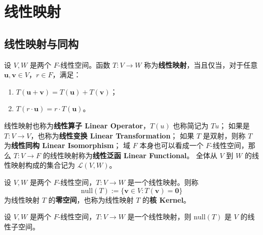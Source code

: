 \section{线性映射}

\subsection{线性映射与同构}

\begin{definition}
    设 $V,W$ 是两个 $F$-线性空间。函数 $T:V\to W$ 称为\textbf{线性映射}，当且仅当，对于任意 $ \mathbf{u},\mathbf{v}\in V $，$ r\in F $，满足：
    \begin{enumerate}
        \item $ T(\mathbf{u}+\mathbf{v}) = T(\mathbf{u}) + T(\mathbf{v}) $；
        \item $ T(r\cdot \mathbf{u}) = r\cdot T(\mathbf{u}) $。
    \end{enumerate}
    线性映射也称为\textbf{线性算子 Linear Operator}，$T(u)$ 也称简记为 $Tu$；
    如果是 $T:V\to V$，也称为\textbf{线性变换 Linear Transformation}；
    如果 $T$ 是双射，则称 $T$ 为\textbf{线性同构 Linear Isomorphism}；
    域 $F$ 本身也可以看成一个 $F$-线性空间，那么 $T:V\to F$ 的线性映射称为\textbf{线性泛函 Linear Functional}。
    全体从 $V$ 到 $W$ 的线性映射构成的集合记为 $\mathcal{L}(V,W)$。
    \label{def:linear_map}
\end{definition}

\begin{definition}
    设 $V,W$ 是两个 $F$-线性空间，$T:V\to W$ 是一个线性映射。则称
    \[
        \mathrm{null}(T) := \{\mathbf{v}\in V : T(\mathbf{v}) = \mathbf{0}\}
    \]
    为线性映射 $T$ 的\textbf{零空间}，也称为线性映射 $T$ 的\textbf{核 Kernel}。
    \label{def:linear_map_zero_space}
\end{definition}

\begin{proposition}[线性映射的零空间是线性子空间]
    设 $V,W$ 是两个 $F$-线性空间，$T:V\to W$ 是一个线性映射，则 $\mathrm{null}(T)$ 是 $V$ 的线性子空间。
\end{proposition}

